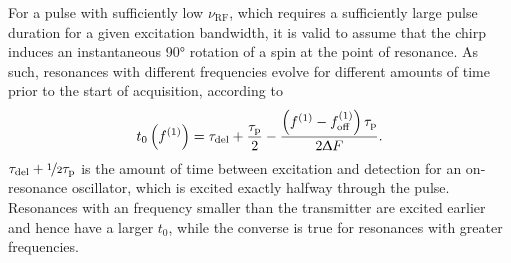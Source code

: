 For a pulse with sufficiently low $\nu_{\text{RF}}$, which requires a
sufficiently large pulse duration for a given excitation bandwidth, it is
valid to assume that the chirp induces an instantaneous \ang{90} rotation
of a spin at the point of resonance. As such, resonances with different
frequencies evolve for different amounts of time prior to the start of
acquisition, according to
\begin{equation}
    t_0\left( f^{(1)} \right) =
        \tau_{\text{del}} + \frac{\tau_{\text{p}}}{2} -
        \frac{\left( f^{(1)} - f_{\mathrm{off}}^{(1)} \right) \tau_{\text{p}}}{2 \Updelta F}.
    \label{eq:t0}
\end{equation}
$\tau_{\text{del}} + \nicefrac{1}{2} \tau_{\text{p}}$ is the amount of time
between excitation and detection for an on-resonance oscillator, which is
excited exactly halfway through the pulse. Resonances
with an frequency smaller than the transmitter are excited earlier and hence
have a larger $t_0$, while the converse is true for resonances with greater
frequencies.


